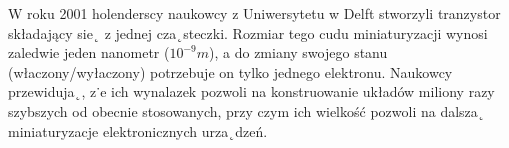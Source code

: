 \documentclass[a4paper,11pt]{article}
\begin{document}
W roku 2001 holenderscy naukowcy z Uniwersytetu w Delft stworzyli tranzystor składający sie˛ z jednej cza˛steczki. Rozmiar tego cudu miniaturyzacji wynosi zaledwie jeden nanometr
($10^{-9}m$), a do zmiany swojego stanu (właczony/wyłaczony) potrzebuje on tylko jednego elektronu.
Naukowcy przewiduja˛, z˙e ich wynalazek pozwoli na konstruowanie układów miliony razy
szybszych od obecnie stosowanych, przy czym ich wielkość pozwoli na dalsza˛ miniaturyzacje elektronicznych urza˛dzeń.
\end{document}
